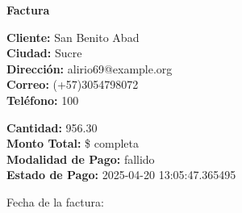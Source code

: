 \documentclass{article}
\begin{document}
\begin{center}
    {\LARGE \textbf{Factura}}\\[1cm]
\end{center}

\textbf{Cliente:} San Benito Abad \\
\textbf{Ciudad:} Sucre \\
\textbf{Dirección:} alirio69@example.org \\
\textbf{Correo:} (+57)3054798072 \\
\textbf{Teléfono:} 100 \\

\vspace{0.5cm}

\textbf{Cantidad:} 956.30 \\
\textbf{Monto Total:} \$ completa \\
\textbf{Modalidad de Pago:} fallido \\
\textbf{Estado de Pago:} 2025-04-20 13:05:47.365495 \\

\vspace{1cm}

Fecha de la factura: 
\end{document}
